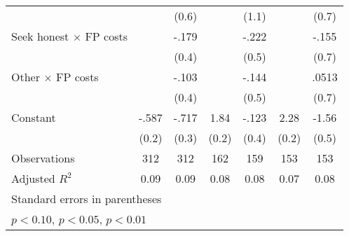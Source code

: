 \begin{table}[htbp]
\begin{tabular}{l*{6}{c}}
                &                  &    (0.6)         &                  &    (1.1)         &                  &    (0.7)         \\
Seek honest $\times$ FP costs&                  &    -.179         &                  &    -.222         &                  &    -.155         \\
                &                  &    (0.4)         &                  &    (0.5)         &                  &    (0.7)         \\
Other $\times$ FP costs&                  &    -.103         &                  &    -.144         &                  &    .0513         \\
                &                  &    (0.4)         &                  &    (0.5)         &                  &    (0.7)         \\
Constant        &    -.587\sym{**} &    -.717\sym{**} &     1.84\sym{***}&    -.123         &     2.28\sym{***}&    -1.56\sym{***}\\
                &    (0.2)         &    (0.3)         &    (0.2)         &    (0.4)         &    (0.2)         &    (0.5)         \\
\hline
Observations    &      312         &      312         &      162         &      159         &      153         &      153         \\
Adjusted \(R^{2}\)&     0.09         &     0.09         &     0.08         &     0.08         &     0.07         &     0.08         \\
\hline\hline
\multicolumn{7}{l}{\footnotesize Standard errors in parentheses}\\
\multicolumn{7}{l}{\footnotesize \sym{*} \(p<0.10\), \sym{**} \(p<0.05\), \sym{***} \(p<0.01\)}\\
\end{tabular}
\end{table}
